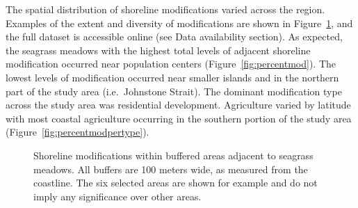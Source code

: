 \documentclass[12pt]{article}\usepackage[]{graphicx}\usepackage[]{color}
\begin{document}
The spatial distribution of shoreline modifications varied across the region. Examples of the extent and diversity of modifications are shown in Figure~\ref{fig:exampleareas}, and the full dataset is accessible online (see Data availability section). As expected, the seagrass meadows with the highest total levels of adjacent shoreline modification occurred near population centers (Figure~\ref{fig:percentmod}). The lowest levels of modification occurred near smaller islands and in the northern part of the study area (i.e.~Johnstone Strait). The dominant modification type across the study area was residential development. Agriculture varied by latitude with most coastal agriculture occurring in the southern portion of the study area (Figure~\ref{fig:percentmodpertype}).
\begin{figure}[H]

{\centering {} 

}

\caption{Shoreline modifications within buffered areas adjacent to seagrass meadows. All buffers are 100 meters wide, as measured from the coastline. The six selected areas are shown for example and do not imply any significance over other areas.}\label{fig:exampleareas}
\end{figure}
\end{document}
